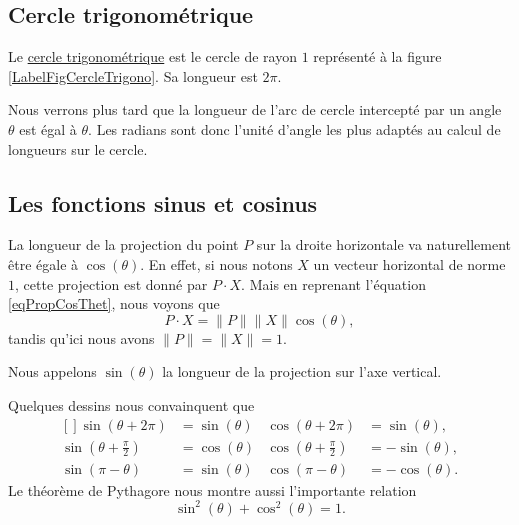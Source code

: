 \subsection{Cercle trigonométrique}

Le \href{http://fr.wikiversity.org/wiki/Trigonométrie/Cosinus_et_sinus_dans_le_cercle_trigonométrique}{cercle trigonométrique} est le cercle de rayon $1$ représenté à la figure \ref{LabelFigCercleTrigono}. Sa longueur est $2\pi$.
\newcommand{\CaptionFigCercleTrigono}{Le cercle trigonométrique.}


Nous verrons plus tard que la longueur de l'arc de cercle intercepté par un angle $\theta$ est égal à $\theta$. Les radians sont donc l'unité d'angle les plus adaptés au calcul de longueurs sur le cercle. 


\subsection{Les fonctions sinus et cosinus}

La longueur de la projection du point $P$ sur la droite horizontale va naturellement être égale à $\cos(\theta)$. En effet, si nous notons $X$ un vecteur horizontal de norme $1$, cette projection est donné par $P\cdot X$. Mais en reprenant l'équation \eqref{eqPropCosThet}, nous voyons que
\begin{equation}
	P\cdot X=\| P \|\| X \|\cos(\theta),
\end{equation}
tandis qu'ici nous avons $\| P \|=\| X \|=1$.

Nous appelons $\sin(\theta)$ la longueur de la projection sur l'axe vertical.

Quelques dessins nous convainquent que 
\begin{equation}
	\begin{aligned}[]
		\sin(\theta+2\pi)&=\sin(\theta)&\cos(\theta+2\pi)&=\sin(\theta),\\
		\sin(\theta+\frac{ \pi }{2})&=\cos(\theta)&\cos(\theta+\frac{ \pi }{2})&=-\sin(\theta),\\
		\sin(\pi-\theta)&=\sin(\theta)&\cos(\pi-\theta)&=-\cos(\theta).
	\end{aligned}
\end{equation}
Le théorème de Pythagore nous montre aussi l'importante relation
\begin{equation}
	\sin^2(\theta)+\cos^2(\theta)=1.
\end{equation}

